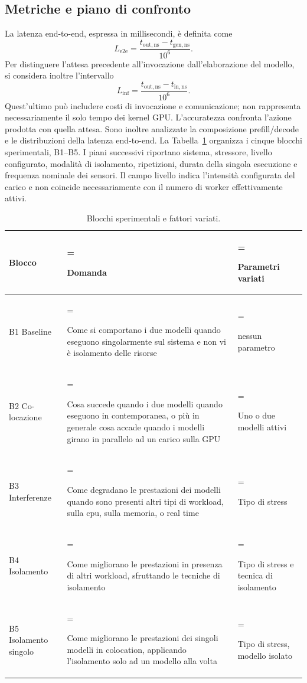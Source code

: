 \documentclass[conference]{IEEEtran}
\begin{document}
\subsection{Metriche e piano di confronto}
La latenza end-to-end, espressa in millisecondi, è definita come
\begin{equation}
L_{\mathrm{e2e}}=\frac{t_{\mathrm{out,ns}}-t_{\mathrm{gen,ns}}}{10^6}.
\end{equation}
Per distinguere l'attesa precedente all'invocazione dall'elaborazione del modello, si considera inoltre l'intervallo
\begin{equation}
L_{\mathrm{inf}}=\frac{t_{\mathrm{out,ns}}-t_{\mathrm{in,ns}}}{10^6}.
\end{equation}
Quest'ultimo può includere costi di invocazione e comunicazione; non rappresenta necessariamente il solo tempo dei kernel GPU. L'accuratezza confronta l'azione prodotta con quella attesa. Sono inoltre analizzate la composizione prefill/decode e le distribuzioni della latenza end-to-end.
La Tabella~\ref{tab:blocks} organizza i cinque blocchi sperimentali, B1--B5. I piani successivi riportano sistema, stressore, livello configurato, modalità di isolamento, ripetizioni, durata della singola esecuzione e frequenza nominale dei sensori. Il campo livello indica l'intensità configurata del carico e non coincide necessariamente con il numero di worker effettivamente attivi.

\begin{table}[!htbp]
\centering
\caption{Blocchi sperimentali e fattori variati.}\label{tab:blocks}
\footnotesize

\begin{tabularx}{\columnwidth}{>{\raggedright\arraybackslash}p{} >{\hsize=1.35\hsize\linewidth=\hsize\raggedright\arraybackslash}X >{\hsize=0.65\hsize\linewidth=\hsize\raggedright\arraybackslash}X}
\toprule
Blocco & Domanda & Parametri variati \\
\midrule
B1 Baseline & Come si comportano i due modelli quando eseguono singolarmente sul sistema e non vi è isolamento delle risorse & nessun parametro \\
B2 Co-locazione & Cosa succede quando i due modelli quando eseguono in contemporanea, o più in generale cosa accade quando i modelli girano in parallelo ad un carico sulla GPU & Uno o due modelli attivi \\
B3 Interferenze & Come degradano le prestazioni dei modelli quando sono presenti altri tipi di workload, sulla cpu, sulla memoria, o real time & Tipo di stress \\
B4 Isolamento & Come migliorano le prestazioni in presenza di altri workload, sfruttando le tecniche di isolamento & Tipo di stress e tecnica di isolamento \\
B5 Isolamento singolo & Come migliorano le prestazioni dei singoli modelli in colocation, applicando l’isolamento solo ad un modello alla volta & Tipo di stress, modello isolato \\
\bottomrule
\end{tabularx}
\end{table}
\end{document}
